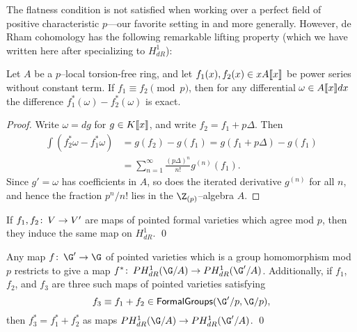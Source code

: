 
The flatness condition is not satisfied when working over a perfect field of positive characteristic $p$---our favorite setting in  and  more generally.  However, de Rham cohomology has the following remarkable lifting property (which we have written here after specializing to $H^1_{dR}$):

\begin{theorem}{\cite[Key Lemma 5.1.3]{Katz}}
Let $A$ be a $p$--local torsion-free ring, and let $f_1(x), f_2(x) \in x A\llbracket{x}\rrbracket$ be power series without constant term.  If $f_1 \equiv f_2 \pmod{p}$, then for any differential $\omega \in A\llbracket{x}\rrbracket dx$ the difference $f_1^*(\omega) - f_2^*(\omega)$ is exact.
\end{theorem}
\begin{proof}
Write $\omega = dg$ for $g \in K\llbracket{x}\rrbracket$, and write $f_2 = f_1 + p\Delta$.  Then
\begin{align*}
\int \left( f_2^* \omega - f_1^* \omega \right) & = g(f_2) - g(f_1) = g(f_1 + p\Delta) - g(f_1) \\
& = \sum_{n = 1}^\infty \frac{(p\Delta)^n}{n!} g^{(n)}(f_1).
\end{align*}
Since $g' = \omega$ has coefficients in $A$, so does the iterated derivative $g^{(n)}$ for all $n$, and hence the fraction $p^n/n!$ lies in the $\Z_{(p)}$--algebra $A$.
\end{proof}

\begin{corollary}[{$H^1_{dR}$ is ``crystalline''}]\label{H1dRIsCrystalline}
If $f_1, f_2\colon\thinspace V \to V'$ are maps of pointed formal varieties which agree mod $p$, then they induce the same map on $H^1_{dR}$. \qed
\end{corollary}

\begin{corollary}
Any map $f\co \G' \to \G$ of pointed varieties which is a group homomorphism mod $p$ restricts to give a map $f^*\co PH^1_{dR}(\G/A) \to PH^1_{dR}(\G'/A)$.  Additionally, if $f_1$, $f_2$, and $f_3$ are three such maps of pointed varieties satisfying \[f_3 \equiv f_1 + f_2 \in \CatOf{FormalGroups}(\G'/p, \G/p),\] then $f_3^* = f_1^* + f_2^*$ as maps $PH^1_{dR}(\G/A) \to PH^1_{dR}(\G'/A)$. \qed
\end{corollary}

